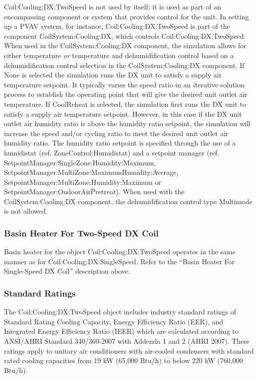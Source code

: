 Coil:Cooling:DX:TwoSpeed is not used by itself; it is used as part of an encompassing component or system that provides control for the unit. In setting up a PVAV system, for instance, Coil:Cooling:DX:TwoSpeed is part of the component CoilSystem:Cooling:DX, which controls Coil:Cooling:DX:TwoSpeed. When used in the CoilSystem:Cooling:DX component, the simulation allows for either temperature \emph{or} temperature and dehumidification control based on a dehumidification control selection in the CoilSystem:Cooling:DX component. If None is selected the simulation runs the DX unit to satisfy a supply air temperature setpoint. It typically varies the speed ratio in an iterative solution process to establish the operating point that will give the desired unit outlet air temperature. If CoolReheat is selected, the simulation first runs the DX unit to satisfy a supply air temperature setpoint. However, in this case if the DX unit outlet air humidity ratio is above the humidity ratio setpoint, the simulation will increase the speed and/or cycling ratio to meet the desired unit outlet air humidity ratio. The humidity ratio setpoint is specified through the use of a humidistat (ref. ZoneControl:Humidistat) and a setpoint manager (ref. SetpointManager:SingleZone:Humidity:Maximum, SetpointManager:MultiZone:MaximumHumidity:Average,~ SetpointManager:MultiZone:Humidity:Maximum or SetpointManager:OudoorAirPretreat). When used with the CoilSystem:Cooling:DX component, the dehumidification control type Multimode is not allowed.

\subsubsection{Basin Heater For Two-Speed DX Coil}\label{basin-heater-for-two-speed-dx-coil}

Basin heater for the object Coil:Cooling:DX:TwoSpeed operates in the same manner as for Coil:Cooling:DX:SingleSpeed. Refer to the ``Basin Heater For Single-Speed DX Coil'' description above.

\subsubsection{Standard Ratings}\label{standard-ratings}

The Coil:Cooling:DX:TwoSpeed object includes industry standard ratings of Standard Rating Cooling Capacity, Energy Efficiency Ratio (EER), and Integrated Energy Efficiency Ratio (IEER) which are calculated according to ANSI/AHRI Standard 340/360-2007 with Addenda 1 and 2 (AHRI 2007). These ratings apply to unitary air conditioners with air-cooled condensers with standard rated cooling capacities from 19 kW (65,000 Btu/h) to below 220 kW (760,000 Btu/h).

